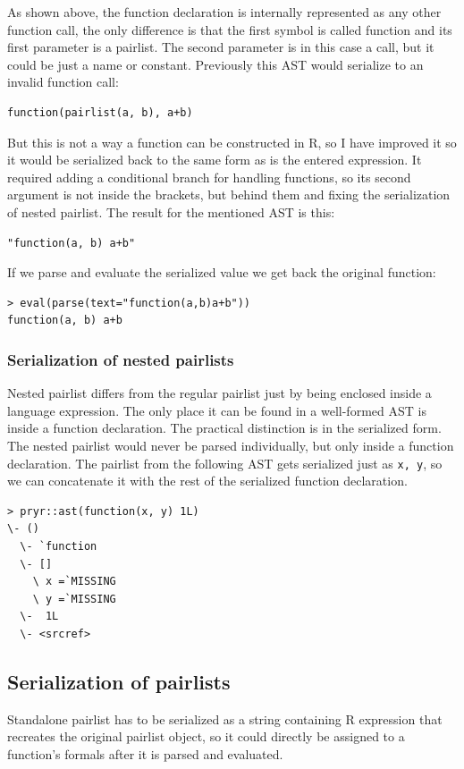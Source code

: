 \documentclass[thesis=B,english]{FITthesis}[2012/10/20]
\begin{document}
As shown above, the function declaration is internally represented as any other function call, the only difference is that the first symbol is called function and its first parameter is a pairlist. The second parameter is in this case a call, but it could be just a name or constant. Previously this AST would serialize to an invalid function call:

\begin{verbatim}
function(pairlist(a, b), a+b)
\end{verbatim}

But this is not a way a function can be constructed in R, so I have improved it so it would be serialized back to the same form as is the entered expression. It required adding a conditional branch for handling functions, so its second argument is not inside the brackets, but behind them and fixing the serialization of nested pairlist. The result for the mentioned AST is this:

\begin{verbatim}
"function(a, b) a+b"
\end{verbatim}

If we parse and evaluate the serialized value we get back the original function:

\begin{verbatim}
> eval(parse(text="function(a,b)a+b"))
function(a, b) a+b
\end{verbatim}

\subsubsection{Serialization of nested pairlists}
Nested pairlist differs from the regular pairlist just by being enclosed inside a language expression. The only place it can be found in a well-formed AST is inside a function declaration. The practical distinction is in the serialized form. The nested pairlist would never be parsed individually, but only inside a function declaration. 
The pairlist from the following AST gets serialized just as \verb|x, y|, so we can concatenate it with the rest of the serialized function declaration.

\begin{verbatim}
> pryr::ast(function(x, y) 1L)
\- ()
  \- `function
  \- []
    \ x =`MISSING
    \ y =`MISSING
  \-  1L
  \- <srcref>
\end{verbatim}
\subsection{Serialization of pairlists}
Standalone pairlist has to be serialized as a string containing R expression that recreates the original pairlist object, so it could directly be assigned to a function’s formals after it is parsed and evaluated.
\end{document}
